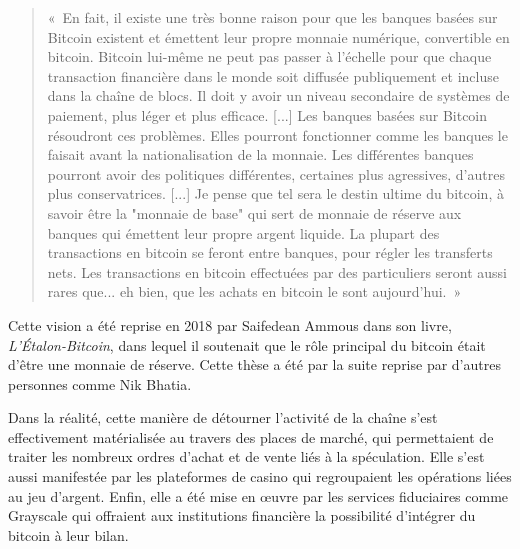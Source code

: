 \begin{quote}
«~En fait, il existe une très bonne raison pour que les banques basées sur Bitcoin existent et émettent leur propre monnaie numérique, convertible en bitcoin. Bitcoin lui-même ne peut pas passer à l'échelle pour que chaque transaction financière dans le monde soit diffusée publiquement et incluse dans la chaîne de blocs. Il doit y avoir un niveau secondaire de systèmes de paiement, plus léger et plus efficace. [...] Les banques basées sur Bitcoin résoudront ces problèmes. Elles pourront fonctionner comme les banques le faisait avant la nationalisation de la monnaie. Les différentes banques pourront avoir des politiques différentes, certaines plus agressives, d'autres plus conservatrices. [...] Je pense que tel sera le destin ultime du bitcoin, à savoir être la "monnaie de base" qui sert de monnaie de réserve aux banques qui émettent leur propre argent liquide. La plupart des transactions en bitcoin se feront entre banques, pour régler les transferts nets. Les transactions en bitcoin effectuées par des particuliers seront aussi rares que... eh bien, que les achats en bitcoin le sont aujourd'hui.~»
\end{quote}

Cette vision a été reprise en 2018 par Saifedean Ammous dans son livre, \emph{L'Étalon-Bitcoin}, dans lequel il soutenait que le rôle principal du bitcoin était d'être une monnaie de réserve. Cette thèse a été par la suite reprise par d'autres personnes comme Nik Bhatia. %

Dans la réalité, cette manière de détourner l'activité de la chaîne s'est effectivement matérialisée au travers des places de marché, qui permettaient de traiter les nombreux ordres d'achat et de vente liés à la spéculation. Elle s'est aussi manifestée par les plateformes de casino qui regroupaient les opérations liées au jeu d'argent. Enfin, elle a été mise en œuvre par les services fiduciaires comme Grayscale qui offraient aux institutions financière la possibilité d'intégrer du bitcoin à leur bilan.


